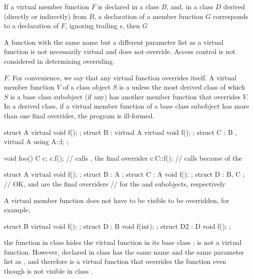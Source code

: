 \pnum
If a virtual member function $F$ is declared in a class $B$, and,
in a class $D$ derived (directly or indirectly) from $B$,
a declaration of a member function $G$
corresponds to a declaration of $F$,
ignoring trailing s,
%
then $G$ 
\begin{footnote}
A function
with the same name but a different parameter list
as a virtual function is not necessarily virtual and
does not override. Access control is not considered in
determining overriding.
\end{footnote}
$F$.
For convenience, we say that any virtual function overrides itself.
%
A virtual member function $V$ of a class object $S$ is a  unless the most derived class of which $S$ is a
base class subobject (if any) has another member function that overrides $V$.
In a derived class, if a virtual member function of a base class subobject
has more than one final overrider, the program is ill-formed.
\begin{example}
\begin{codeblock}
struct A {
  virtual void f();
};
struct B : virtual A {
  virtual void f();
};
struct C : B , virtual A {
  using A::f;
};

void foo() {
  C c;
  c.f();            // calls , the final overrider
  c.C::f();         // calls  because of the 
}
\end{codeblock}
\end{example}

\begin{example}
\begin{codeblock}
struct A { virtual void f(); };
struct B : A { };
struct C : A { void f(); };
struct D : B, C { };            // OK,  and  are the final overriders
                                // for the  and  subobjects, respectively
\end{codeblock}
\end{example}

\pnum
\begin{note}
A virtual member function does not have to be visible to be overridden,
for example,
\begin{codeblock}
struct B {
  virtual void f();
};
struct D : B {
  void f(int);
};
struct D2 : D {
  void f();
};
\end{codeblock}
the function  in class  hides the virtual
function  in its base class ;  is
not a virtual function. However,  declared in class
 has the same name and the same parameter list as
, and therefore is a virtual function that overrides the
function  even though  is not visible in
class .
\end{note}


